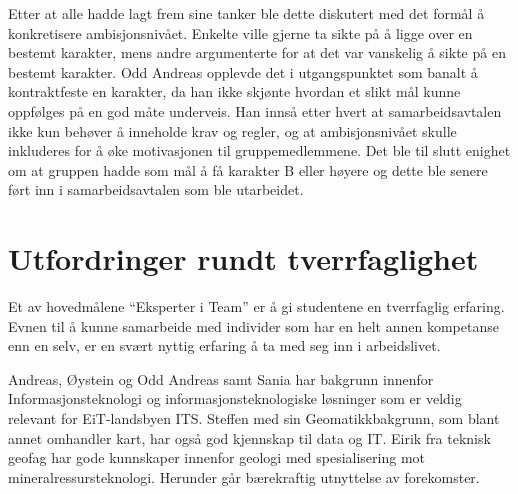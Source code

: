 \documentclass[a4paper,norsk,oneside]{article}
\begin{document}
Etter at alle hadde lagt frem sine tanker ble dette diskutert med det formål å konkretisere ambisjonsnivået. Enkelte ville gjerne ta sikte på å ligge over en bestemt karakter, mens andre argumenterte for at det var vanskelig å sikte på en bestemt karakter. Odd Andreas opplevde det i utgangspunktet som banalt å kontraktfeste en karakter, da han ikke skjønte hvordan et slikt mål kunne oppfølges på en god måte underveis. Han innså etter hvert at samarbeidsavtalen ikke kun behøver å inneholde krav og regler, og at ambisjonsnivået skulle inkluderes for å øke motivasjonen til gruppemedlemmene. Det ble til slutt enighet om at gruppen hadde som mål å få karakter B eller høyere og dette ble senere ført inn i samarbeidsavtalen som ble utarbeidet.

\section{Utfordringer rundt tverrfaglighet}
Et av hovedmålene “Eksperter i Team” er å gi studentene en tverrfaglig erfaring. Evnen til å kunne samarbeide med individer som har en helt annen kompetanse enn en selv, er en svært nyttig erfaring å ta med seg inn i arbeidslivet.

Andreas, Øystein og Odd Andreas samt Sania har bakgrunn innenfor Informasjonsteknologi og informasjonsteknologiske løsninger som er veldig relevant for EiT-landsbyen ITS. Steffen med sin Geomatikkbakgrunn, som blant annet omhandler kart, har også god kjennskap til data og IT. Eirik fra teknisk geofag har gode kunnskaper innenfor geologi med spesialisering mot mineralressursteknologi. Herunder går bærekraftig utnyttelse av forekomster.
\end{document}
